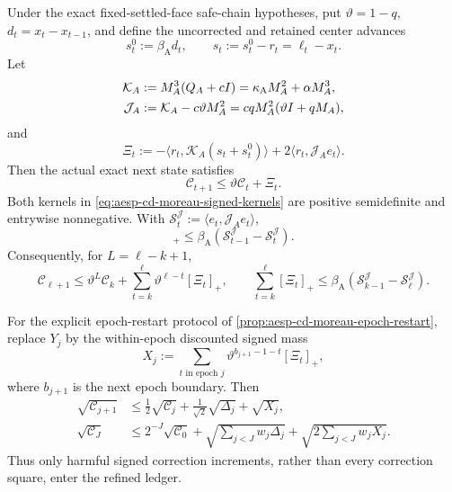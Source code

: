 \begin{proposition}
\label{prop:aesp-cd-moreau-signed-event}
Under the exact fixed-settled-face safe-chain hypotheses, put
$\vartheta=1-q$, $d_t=x_t-x_{t-1}$, and define the uncorrected and retained
center advances
\begin{equation*}
 s_t^0:=\beta_{\mathrm A}d_t,
 \qquad s_t:=s_t^0-r_t=\ell_t-x_t.
\end{equation*}
Let
\begin{align}
 \mathcal K_A
 &:=M_A^3(Q_A+cI)
   =\kappa_{\mathrm A}M_A^2+\alpha M_A^3,\notag\\
 \mathcal J_A
 &:=\mathcal K_A-c\vartheta M_A^2
   =cqM_A^2(\vartheta I+qM_A),
 \label{eq:aesp-cd-moreau-signed-kernels}
\end{align}
and
\begin{equation}
 \Xi_t:=-\langle r_t,\mathcal K_A(s_t+s_t^0)\rangle
       +2\langle r_t,\mathcal J_Ae_t\rangle.
 \label{eq:aesp-cd-moreau-signed-increment}
\end{equation}
Then the actual exact next state satisfies
\begin{equation}
 \mathcal C_{t+1}\leq\vartheta\mathcal C_t+\Xi_t.
 \label{eq:aesp-cd-moreau-signed-recursion}
\end{equation}
Both kernels in \cref{eq:aesp-cd-moreau-signed-kernels} are positive
semidefinite and entrywise nonnegative.  With
$\mathcal S_t^{\mathcal J}:=\langle e_t,\mathcal J_Ae_t\rangle$,
\begin{equation}
 [\Xi_t]_+
 \leq\beta_{\mathrm A}
   (\mathcal S_{t-1}^{\mathcal J}-\mathcal S_t^{\mathcal J}).
 \label{eq:aesp-cd-moreau-signed-payment}
\end{equation}
Consequently, for $L=\ell-k+1$,
\begin{equation}
 \mathcal C_{\ell+1}
 \leq\vartheta^L\mathcal C_k
 +\sum_{t=k}^{\ell}\vartheta^{\ell-t}[\Xi_t]_+,
 \qquad
 \sum_{t=k}^{\ell}[\Xi_t]_+
 \leq\beta_{\mathrm A}
 (\mathcal S_{k-1}^{\mathcal J}-\mathcal S_\ell^{\mathcal J}).
 \label{eq:aesp-cd-moreau-signed-window}
\end{equation}

For the explicit epoch-restart protocol of
\cref{prop:aesp-cd-moreau-epoch-restart}, replace $Y_j$ by the within-epoch
discounted signed mass
\begin{equation*}
 X_j:=\sum_{t\text{ in epoch }j}
 \vartheta^{b_{j+1}-1-t}[\Xi_t]_+,
\end{equation*}
where $b_{j+1}$ is the next epoch boundary.  Then
\begin{align}
 \sqrt{\mathcal C_{j+1}}
 &\leq\frac12\sqrt{\mathcal C_j}
   +\frac1{\sqrt2}\sqrt{\Delta_j}+\sqrt{X_j},
 \label{eq:aesp-cd-moreau-signed-epoch}\\
 \sqrt{\mathcal C_J}
 &\leq2^{-J}\sqrt{\mathcal C_0}
   +\sqrt{\sum_{j<J}w_j\Delta_j}
   +\sqrt{2\sum_{j<J}w_jX_j}.
 \label{eq:aesp-cd-moreau-signed-net}
\end{align}
Thus only harmful signed correction increments, rather than every correction
square, enter the refined ledger.
\end{proposition}

